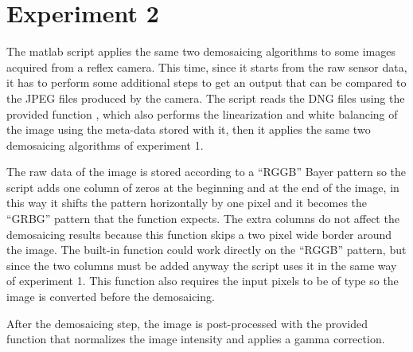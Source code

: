 \documentclass[a4paper,oneside]{article}
\begin{document}
\section*{Experiment 2}
The matlab script  applies the same two demosaicing
algorithms to some images acquired from a reflex camera. This time,
since it starts from the raw sensor data, it has to perform some
additional steps to get an output that can be compared to the JPEG
files produced by the camera. The script reads the DNG files using the
provided function , which also performs the
linearization and white balancing of the image using the meta-data
stored with it, then it applies the same two demosaicing algorithms
of experiment 1.

The raw data of the image is stored according to a ``RGGB'' Bayer
pattern so the script adds one column of zeros at the beginning and at
the end of the image, in this way it shifts the pattern horizontally
by one pixel and it becomes the ``GRBG'' pattern that the function
 expects. The extra columns do not affect
the demosaicing results because this function skips a two pixel wide
border around the image.  The built-in  function
could work directly on the ``RGGB'' pattern, but since the two columns
must be added anyway the script uses it in the same way of experiment
1. This function also requires the input pixels to be of type
 so the image is converted before the demosaicing.

After the demosaicing step, the image is post-processed with the
provided  function that normalizes the image
intensity and applies a gamma correction.
\end{document}
